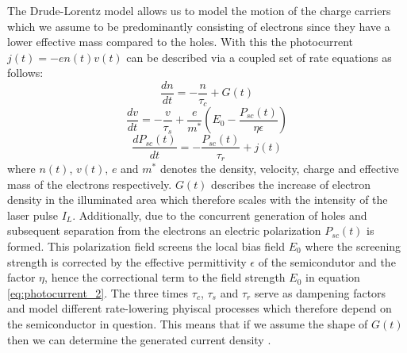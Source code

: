 The Drude-Lorentz model allows us to model the motion of the charge carriers which we assume to be predominantly consisting of electrons since they have a lower effective mass compared to the holes. With this the photocurrent $j(t) = -e n(t) v(t)$ can be described via a coupled set of rate equations as follows:
\begin{equation}
    \frac{dn}{dt} = - \frac{n}{\tau_c} + G(t)
\end{equation}
\begin{equation}
    \label{eq:photocurrent_2}
    \frac{dv}{dt} = - \frac{v}{\tau_s} + \frac{e}{m^*}\left(E_0 - \frac{P_{sc}(t)}{\eta \epsilon} \right)
\end{equation}
\begin{equation}
    \frac{dP_{sc}(t)}{dt} = -\frac{P_{sc}(t)}{\tau_r}+j(t)
\end{equation}
where $n(t)$, $v(t)$, $e$ and $m^*$ denotes the density, velocity, charge and effective mass of the electrons respectively. $G(t)$ describes the increase of electron density in the illuminated area which therefore scales with the intensity of the laser pulse $I_L$. Additionally, due to the concurrent generation of holes and subsequent separation from the electrons an electric polarization $P_{sc}(t)$ is formed. This polarization field screens the local bias field $E_0$ where the screening strength is corrected by the effective permittivity $\epsilon$ of the semicondutor and the factor $\eta$, hence the correctional term to the field strength $E_0$ in equation \ref{eq:photocurrent_2}. The three times $\tau_c$, $\tau_s$ and $\tau_r$ serve as dampening factors and model different rate-lowering phyiscal processes which therefore depend on the semiconductor in question. This means that if we assume the shape of $G(t)$ then we can determine the generated current density \cite{Rutz2007}.

